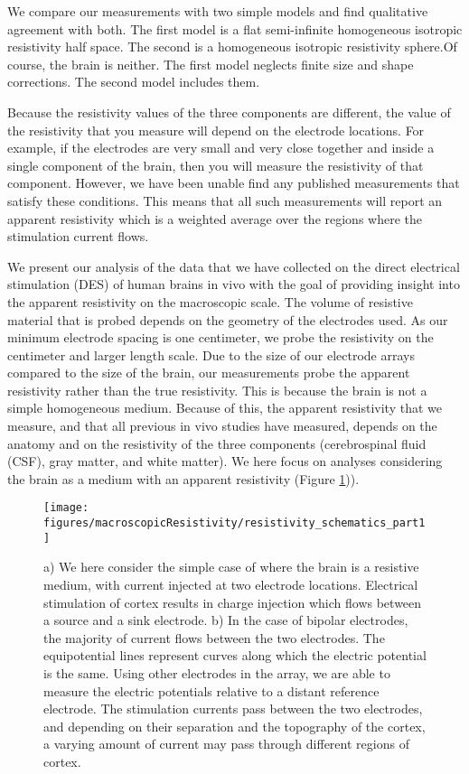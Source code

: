 We compare our measurements with two simple models and find qualitative agreement with both. The first model is a flat semi-infinite homogeneous isotropic resistivity half space. The second is a homogeneous isotropic resistivity sphere.Of course, the brain is neither. The first model neglects finite size and shape corrections. The second model includes them.

Because the resistivity values of the three components are different, the value of the resistivity that you measure will depend on the electrode locations. For example, if the electrodes are very small and very close together and inside a single component of the brain, then you will measure the resistivity of that component. However, we have been unable find any published measurements that satisfy these conditions. This means that all such measurements will report an apparent resistivity which is a weighted average over the regions where the stimulation current flows.

We present our analysis of the data that we have collected on the direct electrical stimulation (DES) of human brains in vivo with the goal of providing insight into the apparent resistivity on the macroscopic scale. The volume of resistive material that is probed depends on the geometry of the electrodes used. As our minimum electrode spacing is one centimeter, we probe the resistivity on the centimeter and larger length scale. Due to the size of our electrode arrays compared to the size of the brain, our measurements probe the apparent resistivity rather than the true resistivity. This is because the brain is not a simple homogeneous medium. Because of this, the apparent resistivity that we measure, and that all previous in vivo studies have measured, depends on the anatomy and on  the resistivity of the three components (cerebrospinal fluid (CSF), gray matter, and white matter). We here focus on analyses considering the brain as a medium with an apparent resistivity (Figure \ref{fig:mrModelingOverview})). 


\begin{figure}[ht]
	\centering
	\texttt{[image: figures/macroscopicResistivity/resistivity\_schematics\_part1]}
	\caption[What is the resistance of the human brain?]{a) We here consider the simple case of where the brain is a resistive medium, with current injected at two electrode locations. Electrical stimulation of cortex results in charge injection which flows between a source and a sink electrode. b) In the case of bipolar electrodes, the majority of current flows between the two electrodes. The equipotential lines represent curves along which the electric potential is the same. Using other electrodes in the array, we are able to measure the electric potentials relative to a distant reference electrode.  The stimulation currents pass between the two electrodes, and depending on their separation and the topography of the cortex, a varying amount of current may pass through different regions of cortex. }
	\label{fig:mrModelingOverview}
\end{figure}

